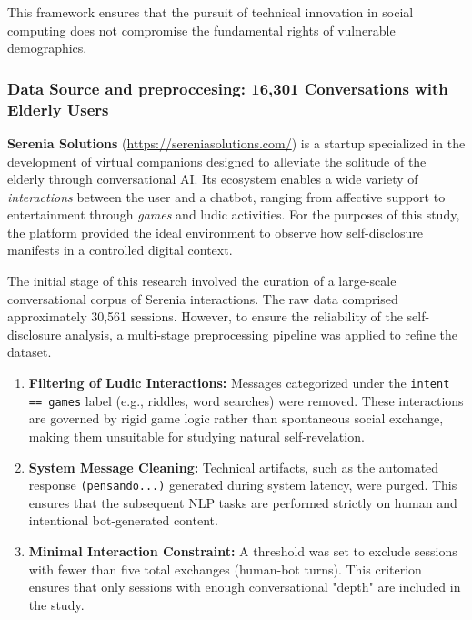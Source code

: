 This framework ensures that the pursuit of technical innovation in social computing does not compromise the fundamental rights of vulnerable demographics.



\subsubsection{Data Source and preproccesing: 16,301 Conversations with Elderly Users}

\noindent \textbf{Serenia Solutions} (\url{https://sereniasolutions.com/}) is a startup specialized in the development of virtual companions designed to alleviate the solitude of the elderly  through conversational AI. Its ecosystem enables a wide variety of \textit{interactions} between the user and a chatbot, ranging from affective support to entertainment through \textit{games} and ludic activities. For the purposes of this study, the platform provided the ideal environment to observe how self-disclosure manifests in a controlled digital context.

The initial stage of this research involved the curation of a large-scale conversational corpus of Serenia interactions. The raw data comprised approximately 30,561 sessions. However, to ensure the reliability of the self-disclosure analysis, a multi-stage preprocessing pipeline was applied to refine the dataset.

\begin{enumerate}
    \item \textbf{Filtering of Ludic Interactions:} Messages categorized under the \texttt{intent == games} label (e.g., riddles, word searches) were removed. These interactions are governed by rigid game logic rather than spontaneous social exchange, making them unsuitable for studying natural self-revelation.
    \item \textbf{System Message Cleaning:} Technical artifacts, such as the automated response \texttt{(pensando...)} generated during system latency, were purged. This ensures that the subsequent NLP  tasks are performed strictly on human and intentional bot-generated content.
    \item \textbf{Minimal Interaction Constraint:} A threshold was set to exclude sessions with fewer than five total exchanges (human-bot turns). This criterion ensures that only sessions with enough conversational "depth"  are included in the study.
\end{enumerate}



